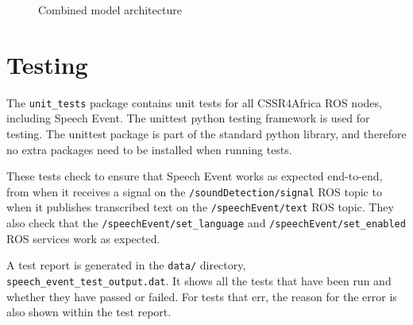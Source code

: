 \documentclass{CSSRforAfrica}
\begin{document}
\begin{figure}[thb]
\begin{center}
\end{center}
\caption{Combined model architecture}
\label{fig:combined}
\end{figure}


\newpage
\section{Testing}
The \texttt{unit\_tests} package contains unit tests for all CSSR4Africa ROS nodes, including Speech Event. The unittest python testing framework is used for testing. The unittest package is part of the standard python library, and therefore no extra packages need to be installed when running tests.

These tests check to ensure that Speech Event works as expected end-to-end, from when it receives a signal on the \texttt{/soundDetection/signal} ROS topic to when it publishes transcribed text on the \texttt{/speechEvent/text} ROS topic. They also check that the \texttt{/speechEvent/set\_language} and \texttt{/speechEvent/set\_enabled} ROS services work as expected.

A test report is generated in the \texttt{data/} directory, \texttt{speech\_event\_test\_output.dat}. It shows all the tests that have been run and whether they have passed or failed. For tests that err, the reason for the error is also shown within the test report.
\end{document}
